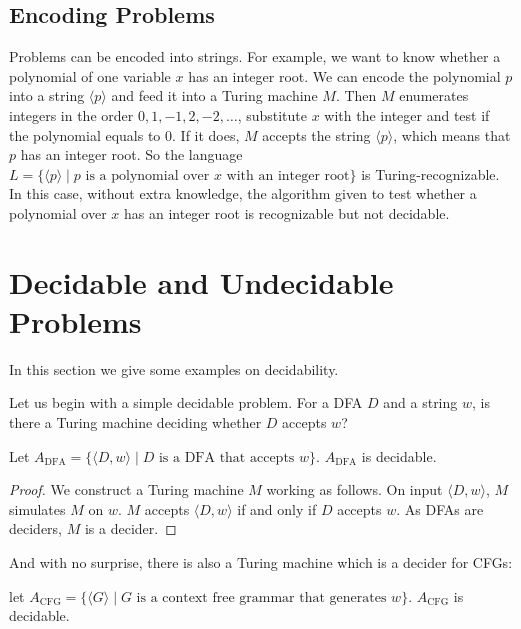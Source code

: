 \documentclass[11pt]{article}
\begin{document}
\subsection{Encoding Problems}

Problems can be encoded into strings. For example, we want to know whether a polynomial of one
variable $x$ has an integer root. We can encode the polynomial $p$ into a string $\langle p
\rangle$ and feed it into a Turing machine $M$. Then $M$ enumerates integers in the order $0,1,-1,
2,-2,\dots$, substitute $x$ with the integer and test if the polynomial equals to $0$. If it does,
$M$ accepts the string $\langle p \rangle$, which means that $p$ has an integer root. So the
language $L = \{\langle p \rangle \mid p \text{ is a polynomial over } x \text{ with an integer
root}\}$ is Turing-recognizable. In this case, without extra knowledge, the algorithm given to test
whether a polynomial over $x$ has an integer root is recognizable but not decidable.

\section{Decidable and Undecidable Problems}

In this section we give some examples on decidability.

Let us begin with a simple decidable problem. For a DFA $D$ and a string $w$, is there a Turing
machine deciding whether $D$ accepts $w$?

\begin{theorem}
Let $A_{\mathrm{DFA}} = \{\langle D,w \rangle \mid D \text{ is a DFA that accepts } w\}$. $A_{\mathrm{DFA}}$ is
decidable.
\end{theorem}

\begin{proof}
We construct a Turing machine $M$ working as follows. On input $\langle D,w \rangle$, $M$ simulates
$M$ on $w$. $M$ accepts $\langle D,w \rangle$ if and only if $D$ accepts $w$. As DFAs are deciders,
$M$ is a decider.
\end{proof}

And with no surprise, there is also a Turing machine which is a decider for CFGs:

\begin{theorem}
let $A_{\mathrm{CFG}} = \{\langle G \rangle \mid G \text{ is a context free grammar that generates } w\}$.
$A_{\mathrm{CFG}}$ is decidable.
\end{theorem}
\end{document}
